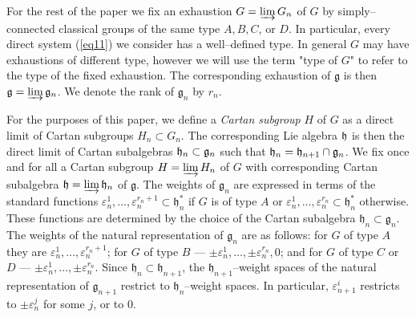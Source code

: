\documentclass[12pt]{amsart}
\def\gg{\mathfrak{g}}
\def\gh{\mathfrak{h}}
\def\inj{\varinjlim}
\def\vep{\varepsilon}
\theoremstyle{remark}
\begin{document}
For the rest of the paper we fix an exhaustion $G = \inj G_n$ of $G$ by simply--connected classical groups
of the same type $A, B, C$, or $D$. In particular, every direct system (\ref{eq11}) we consider has 
a well--defined type.
In general $G$ may have exhaustions of different type, however we will use the term "type of $G$" to 
refer to the type of the fixed exhaustion. The corresponding exhaustion of $\gg$ is then $\gg = \inj \gg_n$.
We denote  the rank of $\gg_n$ by $r_n$.

For the purposes of this paper, we define a {\it Cartan subgroup} $H$ of $G$ as a direct limit 
of Cartan subgroups $H_{n} \subset G_{n}$. 
The corresponding Lie algebra $\frak{h}$ is then the direct limit of Cartan subalgebras 
$\frak{h}_{n} \subset \frak{g}_{n}$ such that $\frak{h}_{n} = \frak{h}_{n+1} \cap \frak{g}_{n}$. We 
fix once and for all a Cartan subgroup $H = \inj H_n$ of $G$ with corresponding Cartan subalgebra
$\gh = \inj \gh_n$ of $\gg$. The weights of $\gg_n$ are expressed in terms of the standard functions 
$\vep_n^1, \ldots, \vep_n^{r_n + 1} \subset \gh_n^*$ if $G$ is of type $A$ or 
$\vep_n^1, \ldots, \vep_n^{r_n} \subset \gh_n^*$ otherwise. These functions are determined by the choice of the Cartan
subalgebra $\gh_n \subset \gg_n$. The weights of the natural representation of $\gg_n$ are as follows: for $G$ of type $A$ 
they are $\vep_n^1, \ldots, \vep_n^{r_n + 1}$; for $G$ of type $B$ --- $\pm \vep_n^1, \ldots, \pm \vep_n^{r_n}, 0$; and
for $G$ of type $C$ or $D$ --- $\pm \vep_n^1, \ldots, \pm \vep_n^{r_n}$.  Since $\gh_n \subset \gh_{n+1}$, the 
$\gh_{n+1}$--weight spaces of the natural representation of $\gg_{n+1}$ restrict to $\gh_n$--weight spaces. In particular,
 $\vep_{n+1}^i$ restricts to $\pm\vep_n^j$ for some $j$, or to $0$. 
\end{document}
